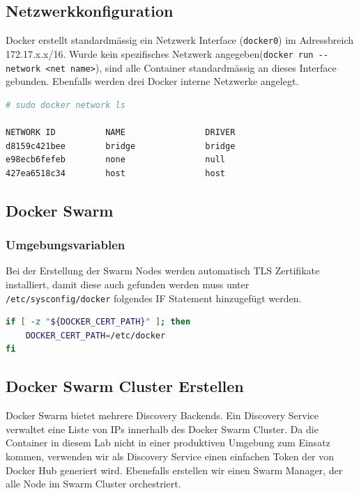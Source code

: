\subsection{Netzwerkkonfiguration}
Docker erstellt standardmässig ein Netzwerk Interface (\lstinline[]|docker0|) im Adressbreich 172.17.x.x/16. Wurde kein spezifisches Netzwerk angegeben(\lstinline[]|docker run --network <net name>|), sind alle Container standardmässig an dieses Interface gebunden. Ebenfalls werden drei Docker interne Netzwerke angelegt.
\begin{lstlisting}[language=bash]
# sudo docker network ls

NETWORK ID          NAME                DRIVER
d8159c421bee        bridge              bridge              
e98ecb6fefeb        none                null                
427ea6518c34        host                host    
\end{lstlisting}

\subsection{Docker Swarm}
\subsubsection{Umgebungsvariablen}
Bei der Erstellung der Swarm Nodes werden automatisch TLS Zertifikate installiert, damit diese auch gefunden werden muss unter \lstinline[]|/etc/sysconfig/docker| folgendes IF Statement hinzugefügt werden. 
\begin{lstlisting}[caption=/etc/sysconfig/docker, language=bash]
if [ -z "${DOCKER_CERT_PATH}" ]; then
	DOCKER_CERT_PATH=/etc/docker
fi
\end{lstlisting}

\subsection{Docker Swarm Cluster Erstellen}
Docker Swarm bietet mehrere Discovery Backends. Ein Discovery Service verwaltet eine Liste von IPs innerhalb des Docker Swarm Cluster. Da die Container in diesem Lab nicht in einer produktiven Umgebung zum Einsatz kommen, verwenden wir als Discovery Service einen einfachen Token der von Docker Hub generiert wird. Ebenefalls erstellen wir einen Swarm Manager, der alle Node im Swarm Cluster orchestriert.

